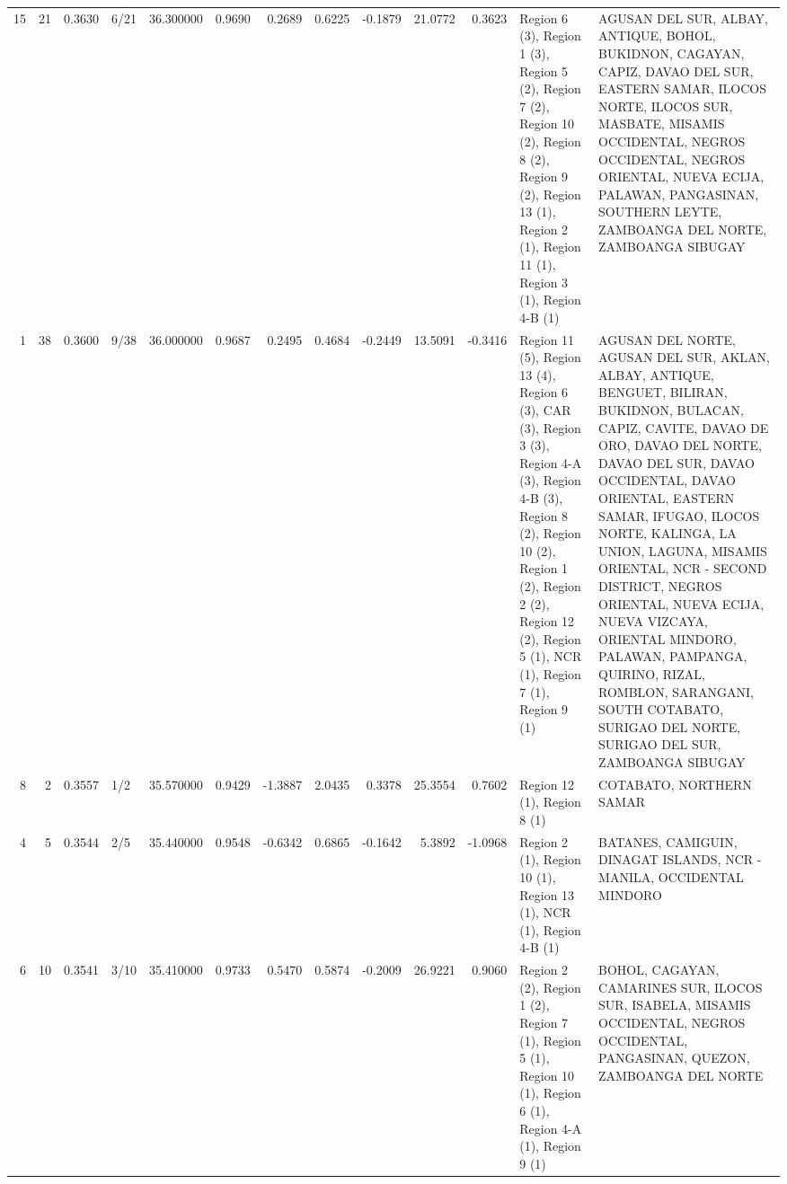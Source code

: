 \begin{tabular}{rrrlrrrrrrrll}
15 & 21 & {\cellcolor[HTML]{82A6FB}} \color[HTML]{F1F1F1} 0.3630 & 6/21 & {\cellcolor[HTML]{82A6FB}} \color[HTML]{F1F1F1} 36.300000 & 0.9690 & 0.2689 & 0.6225 & -0.1879 & 21.0772 & 0.3623 & Region 6 (3), Region 1 (3), Region 5 (2), Region 7 (2), Region 10 (2), Region 8 (2), Region 9 (2), Region 13 (1), Region 2 (1), Region 11 (1), Region 3 (1), Region 4-B (1) & AGUSAN DEL SUR, ALBAY, ANTIQUE, BOHOL, BUKIDNON, CAGAYAN, CAPIZ, DAVAO DEL SUR, EASTERN SAMAR, ILOCOS NORTE, ILOCOS SUR, MASBATE, MISAMIS OCCIDENTAL, NEGROS OCCIDENTAL, NEGROS ORIENTAL, NUEVA ECIJA, PALAWAN, PANGASINAN, SOUTHERN LEYTE, ZAMBOANGA DEL NORTE, ZAMBOANGA SIBUGAY \\
1 & 38 & {\cellcolor[HTML]{7DA0F9}} \color[HTML]{F1F1F1} 0.3600 & 9/38 & {\cellcolor[HTML]{7DA0F9}} \color[HTML]{F1F1F1} 36.000000 & 0.9687 & 0.2495 & 0.4684 & -0.2449 & 13.5091 & -0.3416 & Region 11 (5), Region 13 (4), Region 6 (3), CAR (3), Region 3 (3), Region 4-A (3), Region 4-B (3), Region 8 (2), Region 10 (2), Region 1 (2), Region 2 (2), Region 12 (2), Region 5 (1), NCR (1), Region 7 (1), Region 9 (1) & AGUSAN DEL NORTE, AGUSAN DEL SUR, AKLAN, ALBAY, ANTIQUE, BENGUET, BILIRAN, BUKIDNON, BULACAN, CAPIZ, CAVITE, DAVAO DE ORO, DAVAO DEL NORTE, DAVAO DEL SUR, DAVAO OCCIDENTAL, DAVAO ORIENTAL, EASTERN SAMAR, IFUGAO, ILOCOS NORTE, KALINGA, LA UNION, LAGUNA, MISAMIS ORIENTAL, NCR - SECOND DISTRICT, NEGROS ORIENTAL, NUEVA ECIJA, NUEVA VIZCAYA, ORIENTAL MINDORO, PALAWAN, PAMPANGA, QUIRINO, RIZAL, ROMBLON, SARANGANI, SOUTH COTABATO, SURIGAO DEL NORTE, SURIGAO DEL SUR, ZAMBOANGA SIBUGAY \\
8 & 2 & {\cellcolor[HTML]{7396F5}} \color[HTML]{F1F1F1} 0.3557 & 1/2 & {\cellcolor[HTML]{7396F5}} \color[HTML]{F1F1F1} 35.570000 & 0.9429 & -1.3887 & 2.0435 & 0.3378 & 25.3554 & 0.7602 & Region 12 (1), Region 8 (1) & COTABATO, NORTHERN SAMAR \\
4 & 5 & {\cellcolor[HTML]{7093F3}} \color[HTML]{F1F1F1} 0.3544 & 2/5 & {\cellcolor[HTML]{7093F3}} \color[HTML]{F1F1F1} 35.440000 & 0.9548 & -0.6342 & 0.6865 & -0.1642 & 5.3892 & -1.0968 & Region 2 (1), Region 10 (1), Region 13 (1), NCR (1), Region 4-B (1) & BATANES, CAMIGUIN, DINAGAT ISLANDS, NCR - MANILA, OCCIDENTAL MINDORO \\
6 & 10 & {\cellcolor[HTML]{6F92F3}} \color[HTML]{F1F1F1} 0.3541 & 3/10 & {\cellcolor[HTML]{6F92F3}} \color[HTML]{F1F1F1} 35.410000 & 0.9733 & 0.5470 & 0.5874 & -0.2009 & 26.9221 & 0.9060 & Region 2 (2), Region 1 (2), Region 7 (1), Region 5 (1), Region 10 (1), Region 6 (1), Region 4-A (1), Region 9 (1) & BOHOL, CAGAYAN, CAMARINES SUR, ILOCOS SUR, ISABELA, MISAMIS OCCIDENTAL, NEGROS OCCIDENTAL, PANGASINAN, QUEZON, ZAMBOANGA DEL NORTE \\

\end{tabular}
